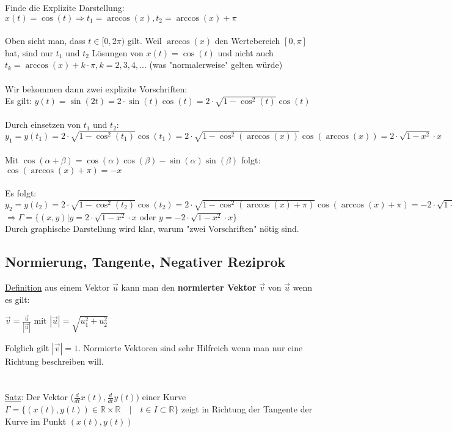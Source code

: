 \documentclass[11pt]{article} %
\begin{document}
Finde die Explizite Darstellung:\\

$x(t) =  \cos(t) \Rightarrow t_1 = \arccos(x), t_2 = \arccos(x) + \pi$ \\\\
Oben sieht man, dass $t\in [0, 2\pi) $ gilt. Weil $\arccos(x)$ den Wertebereich $[0,\pi]$ hat, sind nur $t_1$ und $t_2$ Lösungen von $x(t) = \cos(t)$ und nicht auch $t_k = \arccos(x) + k\cdot\pi, k= 2,3,4,...$ (was "normalerweise" gelten würde)\\\\
Wir bekommen dann zwei explizite Vorschriften:\\
Es gilt: $y(t) =  \sin(2t) = 2\cdot\sin(t)\cos(t) = 2\cdot \sqrt{1-\cos^2(t)}\cos(t)$\\\\
Durch einsetzen von $t_1$ und $t_2$:\\
$y_1 = y(t_1) = 2\cdot \sqrt{1-\cos^2(t_1)}\cos(t_1) = 2\cdot \sqrt{1-\cos^2(\arccos(x))}\cos(\arccos(x)) = 2 \cdot \sqrt{1-x^2}\cdot x$\\\\
Mit $\cos(\alpha + \beta) = \cos(\alpha)\cos(\beta)-\sin(\alpha)\sin(\beta)$ folgt:
$\cos(\arccos(x)+\pi) = -x$\\\\
Es folgt:\\
$y_2 = y(t_2) = 2\cdot \sqrt{1-\cos^2(t_2)}\cos(t_2) = 2\cdot \sqrt{1-\cos^2(\arccos(x)+ \pi)}\cos(\arccos(x)+ \pi) = -2 \cdot \sqrt{1-x^2}\cdot x$\\
$\Rightarrow \Gamma =\{ (x,y) | y = 2\cdot\sqrt{1-x^2}\cdot x$ oder $ y = -2\cdot\sqrt{1-x^2}\cdot x\}$\\

Durch graphische Darstellung wird klar, warum "zwei Vorschriften" nötig sind.

\subsection{Normierung, Tangente, Negativer Reziprok}
\underline{Definition} aus einem Vektor $\vec u$ kann man den {\bf normierter Vektor} $\vec v$ von $\vec u$ wenn es gilt:

\begin{center}
$\vec v = \frac{\vec u}{|\vec u|}$ mit $|\vec u| = \sqrt{u_1^2+ u_2^2}$
\end{center}
Folglich gilt $|\vec v| = 1$. Normierte Vektoren sind sehr Hilfreich wenn man nur eine Richtung beschreiben will.\\\\
\\
\underline{Satz}: Der Vektor ($\frac{d}{dt}x(t), \frac{d}{dt}y(t))$ einer Kurve $\Gamma = \{(x(t),y(t)) \in \mathbb{R} \times \mathbb{R}\quad | \quad t \in I \subset \mathbb{R} \}$ zeigt in Richtung der Tangente der Kurve im Punkt $(x(t),y(t))$ 
\end{document}
